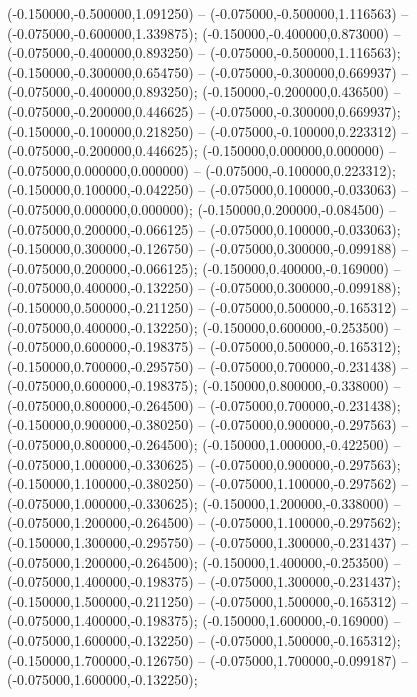  (-0.150000,-0.500000,1.091250) -- (-0.075000,-0.500000,1.116563) -- (-0.075000,-0.600000,1.339875);
 (-0.150000,-0.400000,0.873000) -- (-0.075000,-0.400000,0.893250) -- (-0.075000,-0.500000,1.116563);
 (-0.150000,-0.300000,0.654750) -- (-0.075000,-0.300000,0.669937) -- (-0.075000,-0.400000,0.893250);
 (-0.150000,-0.200000,0.436500) -- (-0.075000,-0.200000,0.446625) -- (-0.075000,-0.300000,0.669937);
 (-0.150000,-0.100000,0.218250) -- (-0.075000,-0.100000,0.223312) -- (-0.075000,-0.200000,0.446625);
 (-0.150000,0.000000,0.000000) -- (-0.075000,0.000000,0.000000) -- (-0.075000,-0.100000,0.223312);
 (-0.150000,0.100000,-0.042250) -- (-0.075000,0.100000,-0.033063) -- (-0.075000,0.000000,0.000000);
 (-0.150000,0.200000,-0.084500) -- (-0.075000,0.200000,-0.066125) -- (-0.075000,0.100000,-0.033063);
 (-0.150000,0.300000,-0.126750) -- (-0.075000,0.300000,-0.099188) -- (-0.075000,0.200000,-0.066125);
 (-0.150000,0.400000,-0.169000) -- (-0.075000,0.400000,-0.132250) -- (-0.075000,0.300000,-0.099188);
 (-0.150000,0.500000,-0.211250) -- (-0.075000,0.500000,-0.165312) -- (-0.075000,0.400000,-0.132250);
 (-0.150000,0.600000,-0.253500) -- (-0.075000,0.600000,-0.198375) -- (-0.075000,0.500000,-0.165312);
 (-0.150000,0.700000,-0.295750) -- (-0.075000,0.700000,-0.231438) -- (-0.075000,0.600000,-0.198375);
 (-0.150000,0.800000,-0.338000) -- (-0.075000,0.800000,-0.264500) -- (-0.075000,0.700000,-0.231438);
 (-0.150000,0.900000,-0.380250) -- (-0.075000,0.900000,-0.297563) -- (-0.075000,0.800000,-0.264500);
 (-0.150000,1.000000,-0.422500) -- (-0.075000,1.000000,-0.330625) -- (-0.075000,0.900000,-0.297563);
 (-0.150000,1.100000,-0.380250) -- (-0.075000,1.100000,-0.297562) -- (-0.075000,1.000000,-0.330625);
 (-0.150000,1.200000,-0.338000) -- (-0.075000,1.200000,-0.264500) -- (-0.075000,1.100000,-0.297562);
 (-0.150000,1.300000,-0.295750) -- (-0.075000,1.300000,-0.231437) -- (-0.075000,1.200000,-0.264500);
 (-0.150000,1.400000,-0.253500) -- (-0.075000,1.400000,-0.198375) -- (-0.075000,1.300000,-0.231437);
 (-0.150000,1.500000,-0.211250) -- (-0.075000,1.500000,-0.165312) -- (-0.075000,1.400000,-0.198375);
 (-0.150000,1.600000,-0.169000) -- (-0.075000,1.600000,-0.132250) -- (-0.075000,1.500000,-0.165312);
 (-0.150000,1.700000,-0.126750) -- (-0.075000,1.700000,-0.099187) -- (-0.075000,1.600000,-0.132250);

